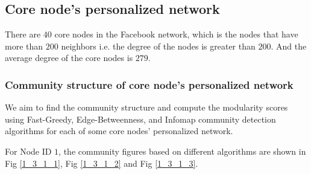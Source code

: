 \documentclass[11pt]{article}
\begin{document}
\subsection{Core node’s personalized network}

There are $40$ core nodes in the Facebook network, which is the nodes that have more than $200$ neighbors i.e. the degree of the nodes is greater than $200$. And the average degree of the core nodes is $279$.

\subsubsection{Community structure of core node’s personalized network}

We aim to find the community structure and compute the modularity scores using Fast-Greedy, Edge-Betweenness, and Infomap community detection algorithms for each of some core nodes’ personalized network.

For Node ID $1$, the community figures based on different algorithms are shown in Fig \ref{1_3_1_1}, Fig \ref{1_3_1_2} and Fig \ref{1_3_1_3}.
\end{document}
